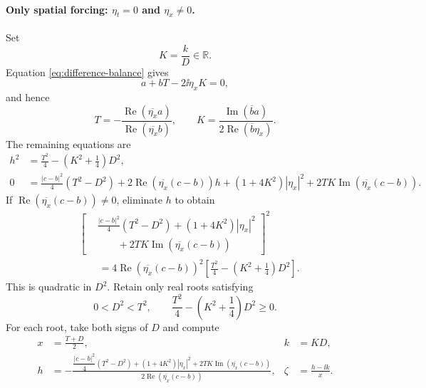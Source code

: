 \paragraph{Only spatial forcing: $\eta_t=0$ and $\eta_x\neq0$.}
Set
\[
 K=\frac{k}{D}\in\mathbb R.
\]
Equation \eqref{eq:difference-balance} gives
\begin{equation}
 a+bT-2\ii\eta_xK=0,
 \label{eq:spatial-TK-equation}
\end{equation}
and hence
\begin{equation}
 T=-\frac{\operatorname{Re}(\overline{\eta_x}a)}
          {\operatorname{Re}(\overline{\eta_x}b)},
 \qquad
 K=\frac{\operatorname{Im}(\overline ba)}
          {2\operatorname{Re}(\overline b\eta_x)}.
 \label{eq:spatial-TK-solution}
\end{equation}
The remaining equations are
\begin{align}
 h^2
 &=\frac{T^2}{4}-\left(K^2+\frac14\right)D^2,
 \label{eq:spatial-h-constraint}\\
 0
 &=\frac{|c-b|^2}{4}(T^2-D^2)
   +2\operatorname{Re}\!\left(\overline{\eta_x}(c-b)\right)h
   +(1+4K^2)|\eta_x|^2
   +2TK\operatorname{Im}\!\left(\overline{\eta_x}(c-b)\right).
 \label{eq:spatial-h-balance}
\end{align}
If $\operatorname{Re}(\overline{\eta_x}(c-b))\neq0$, eliminate $h$ to
obtain
\begin{equation}
 \begin{aligned}
 &\left[
  \begin{aligned}
   &\frac{|c-b|^2}{4}(T^2-D^2)+(1+4K^2)|\eta_x|^2\\
   &\qquad
    +2TK\operatorname{Im}\!\left(\overline{\eta_x}(c-b)\right)
  \end{aligned}
 \right]^2\\
 &\qquad
 =4\operatorname{Re}\!\left(\overline{\eta_x}(c-b)\right)^2
 \left[
  \frac{T^2}{4}-\left(K^2+\frac14\right)D^2
 \right].
 \end{aligned}
 \label{eq:spatial-D-quadratic}
\end{equation}
This is quadratic in $D^2$.  Retain only real roots satisfying
\begin{equation}
 0<D^2<T^2,
 \qquad
 \frac{T^2}{4}-\left(K^2+\frac14\right)D^2\geq0.
 \label{eq:spatial-admissibility}
\end{equation}
For each root, take both signs of $D$ and compute
\begin{equation}
 \begin{aligned}
 x&=\frac{T+D}{2},
 &k&=KD,\\
 h&=-\frac{
 \dfrac{|c-b|^2}{4}(T^2-D^2)+(1+4K^2)|\eta_x|^2
 +2TK\operatorname{Im}\!\left(\overline{\eta_x}(c-b)\right)}
 {2\operatorname{Re}\!\left(\overline{\eta_x}(c-b)\right)},
 &\zeta&=\frac{h-\ii k}{x}.
 \end{aligned}
 \label{eq:spatial-reconstruction}
\end{equation}
